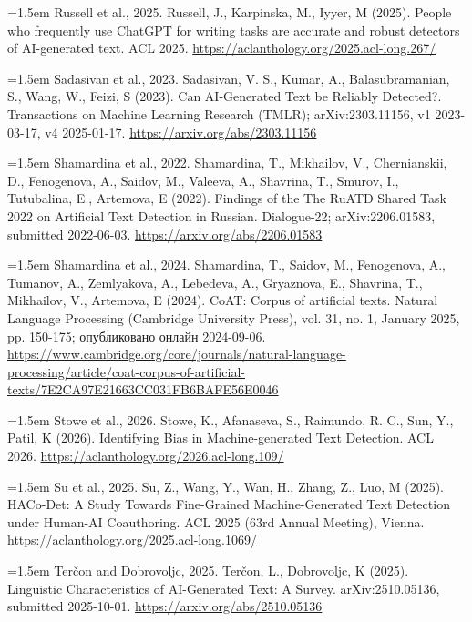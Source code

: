 \documentclass[11pt,a4paper]{article}
\renewcommand{\_}{\textunderscore\allowbreak}
\begin{document}
\noindent\hangindent=1.5em Russell et al., 2025. Russell, J., Karpinska, M., Iyyer, M (2025). People who frequently use ChatGPT for writing tasks are accurate and robust detectors of AI-generated text. ACL 2025. \url{https://aclanthology.org/2025.acl-long.267/}\par\smallskip

\noindent\hangindent=1.5em Sadasivan et al., 2023. Sadasivan, V. S., Kumar, A., Balasubramanian, S., Wang, W., Feizi, S (2023). Can AI-Generated Text be Reliably Detected?. Transactions on Machine Learning Research (TMLR); arXiv:2303.11156, v1 2023-03-17, v4 2025-01-17. \url{https://arxiv.org/abs/2303.11156}\par\smallskip

\noindent\hangindent=1.5em Shamardina et al., 2022. Shamardina, T., Mikhailov, V., Chernianskii, D., Fenogenova, A., Saidov, M., Valeeva, A., Shavrina, T., Smurov, I., Tutubalina, E., Artemova, E (2022). Findings of the The RuATD Shared Task 2022 on Artificial Text Detection in Russian. Dialogue-22; arXiv:2206.01583, submitted 2022-06-03. \url{https://arxiv.org/abs/2206.01583}\par\smallskip

\noindent\hangindent=1.5em Shamardina et al., 2024. Shamardina, T., Saidov, M., Fenogenova, A., Tumanov, A., Zemlyakova, A., Lebedeva, A., Gryaznova, E., Shavrina, T., Mikhailov, V., Artemova, E (2024). CoAT: Corpus of artificial texts. Natural Language Processing (Cambridge University Press), vol. 31, no. 1, January 2025, pp. 150-175; \foreignlanguage{russian}{опубликовано онлайн} 2024-09-06. \url{https://www.cambridge.org/core/journals/natural-language-processing/article/coat-corpus-of-artificial-texts/7E2CA97E21663CC031FB6BAFE56E0046}\par\smallskip

\noindent\hangindent=1.5em Stowe et al., 2026. Stowe, K., Afanaseva, S., Raimundo, R. C., Sun, Y., Patil, K (2026). Identifying Bias in Machine-generated Text Detection. ACL 2026. \url{https://aclanthology.org/2026.acl-long.109/}\par\smallskip

\noindent\hangindent=1.5em Su et al., 2025. Su, Z., Wang, Y., Wan, H., Zhang, Z., Luo, M (2025). HACo-Det: A Study Towards Fine-Grained Machine-Generated Text Detection under Human-AI Coauthoring. ACL 2025 (63rd Annual Meeting), Vienna. \url{https://aclanthology.org/2025.acl-long.1069/}\par\smallskip

\noindent\hangindent=1.5em Ter\v{c}on and Dobrovoljc, 2025. Ter\v{c}on, L., Dobrovoljc, K (2025). Linguistic Characteristics of AI-Generated Text: A Survey. arXiv:2510.05136, submitted 2025-10-01. \url{https://arxiv.org/abs/2510.05136}\par\smallskip
\end{document}
